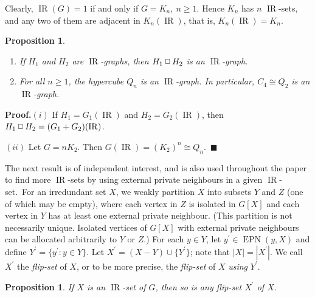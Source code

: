 \documentclass[12pt]{article}%
\newtheorem{proposition}[theorem]{Proposition}
\providecommand{\boksie}{\ensuremath{\mathbin{\raisebox{0.3mm}{$\scriptstyle\square$}}}}
\begin{document}
Clearly, $\operatorname{IR}(G)=1$ if and only if $G=K_{n},\ n\geq1$. Hence
$K_{n}$ has $n$ $\operatorname{IR}$-sets, and any two of them are adjacent in
$K_{n}(\operatorname{IR})$, that is, $K_{n}(\operatorname{IR})=K_{n}$.

\begin{proposition}
\label{Prop_Qn}

\begin{enumerate}
\item[$(i)$] If $H_{1}$ and $H_{2}$ are $\operatorname{IR}$-graphs, then
$H_{1}\boksie H_{2}$ is an $\operatorname{IR}$-graph.

\item[$(ii)$] For all $n\geq1$, the hypercube $Q_{n}$ is an $\operatorname{IR}%
$-graph. In particular, $C_{4}\cong Q_{2}$ is an $\operatorname{IR}$-graph.
\end{enumerate}
\end{proposition}

\noindent\textbf{Proof.\hspace{0.1in}}$(i)$ If $H_{1}=G_{1}(\operatorname{IR}%
)$ and $H_{2}=G_{2}(\operatorname{IR})$, then $H_{1}\boksie H_{2}=(G_{1}%
+G_{2})(\operatorname{IR})$.

\noindent$(ii)$ Let $G=nK_{2}$. Then $G(\operatorname{IR})=(K_{2})^{n}\cong
Q_{n}$.~$\blacksquare$

\bigskip

The next result is of independent interest, and is also used throughout the
paper to find more $\operatorname{IR}$-sets by using external private
neighbours in a given $\operatorname{IR}$-set.\ For an irredundant set $X$, we
weakly partition $X$ into subsets $Y$ and $Z$ (one of which may be empty),
where each vertex in $Z$ is isolated in $G[X]$ and each vertex in $Y$ has at
least one external private neighbour. (This partition is not necessarily
unique. Isolated vertices of $G[X]$ with external private neighbours can be
allocated arbitrarily to $Y$ or $Z$.) For each $y\in Y$, let $y^{\prime}%
\in\operatorname{EPN}(y,X)$ and define $Y^{\prime}=\{y^{\prime}:y\in Y\}$. Let
$X^{\prime}=(X-Y)\cup\{Y^{\prime}\}$; note that $|X|=|X^{\prime}|$. We call
$X^{\prime}$ the \emph{flip-set }of $X$, or to be more precise, the
\emph{flip-set }of $X$ \emph{using }$Y^{\prime}$.

\begin{proposition}
\label{Prop_IR_sets}If $X$ is an $\operatorname{IR}$-set of $G$, then so is
any flip-set $X^{\prime}$ of $X$.
\end{proposition}
\end{document}
